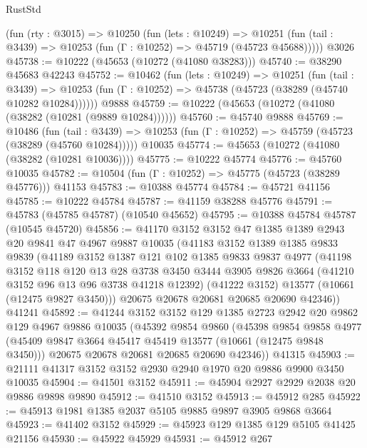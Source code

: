 \begin{lexlean}{RustStd}
\begin{coremodule}
    (fun (rty : @3015) =>
    @10250
      (fun (lets : @10249) =>
      @10251 (fun (tail : @3439) => @10253 (fun (Γ : @10252) => @45719 (@45723 @45688)))))
    @3026
@45738 := @10222 (@45653 (@10272 (@41080 @38283)))
@45740 := @38290 @45683 @42243
@45752 := @10462
    (fun (lets : @10249) =>
    @10251
      (fun (tail : @3439) =>
      @10253 (fun (Γ : @10252) => @45738 (@45723 (@38289 (@45740 @10282 @10284))))))
    @9888
@45759 := @10222 (@45653 (@10272 (@41080 (@38282 (@10281 (@9889 @10284))))))
@45760 := @45740 @9888
@45769 := @10486
    (fun (tail : @3439) => @10253 (fun (Γ : @10252) => @45759 (@45723 (@38289 (@45760 @10284)))))
    @10035
@45774 := @45653 (@10272 (@41080 (@38282 (@10281 @10036))))
@45775 := @10222 @45774
@45776 := @45760 @10035
@45782 := @10504 (fun (Γ : @10252) => @45775 (@45723 (@38289 @45776))) @41153
@45783 := @10388 @45774
@45784 := @45721 @41156
@45785 := @10222 @45784
@45787 := @41159 @38288 @45776
@45791 := @45783 (@45785 @45787) (@10540 @45652)
@45795 := @10388 @45784 @45787 (@10545 @45720)
@45856 := @41170
    @3152
    @3152
    @47
    @1385
    @1389
    @2943
    @20
    @9841
    @47
    @4967
    @9887
    @10035
    (@41183
      @3152
      @1389
      @1385
      @9833
      @9839
      (@41189
        @3152
        @1387
        @121
        @102
        @1385
        @9833
        @9837
        @4977
        (@41198
          @3152
          @118
          @120
          @13
          @28
          @3738
          @3450
          @3444
          @3905
          @9826
          @3664
          (@41210 @3152 @96 @13 @96 @3738 @41218 @12392)
          (@41222 @3152)
          @13577
          (@10661 (@12475 @9827 @3450)))
        @20675
        @20678
        @20681
        @20685
        @20690
        @42346))
    @41241
@45892 := @41244
    @3152
    @3152
    @129
    @1385
    @2723
    @2942
    @20
    @9862
    @129
    @4967
    @9886
    @10035
    (@45392
      @9854
      @9860
      (@45398
        @9854
        @9858
        @4977
        (@45409 @9847 @3664 @45417 @45419 @13577 (@10661 (@12475 @9848 @3450)))
        @20675
        @20678
        @20681
        @20685
        @20690
        @42346))
    @41315
@45903 := @21111 @41317 @3152 @3152 @2930 @2940 @1970 @20 @9886 @9900 @3450 @10035
@45904 := @41501 @3152
@45911 := @45904 @2927 @2929 @2038 @20 @9886 @9898 @9890
@45912 := @41510 @3152
@45913 := @45912 @285
@45922 := @45913 @1981 @1385 @2037 @5105 @9885 @9897 @3905 @9868 @3664
@45923 := @41402 @3152
@45929 := @45923 @129 @1385 @129 @5105 @41425 @21156
@45930 := @45922 @45929
@45931 := @45912 @267

\end{coremodule}
\end{lexlean}
